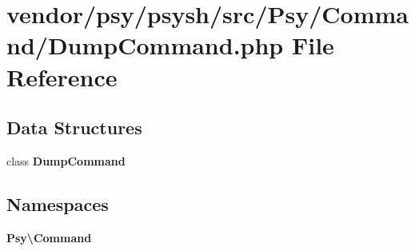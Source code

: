 \section{vendor/psy/psysh/src/\+Psy/\+Command/\+Dump\+Command.php File Reference}
\label{_dump_command_8php}
\subsection*{Data Structures}
\begin{DoxyCompactItemize}
\item 
class {\bf Dump\+Command}
\end{DoxyCompactItemize}
\subsection*{Namespaces}
\begin{DoxyCompactItemize}
\item 
 {\bf Psy\textbackslash{}\+Command}
\end{DoxyCompactItemize}

